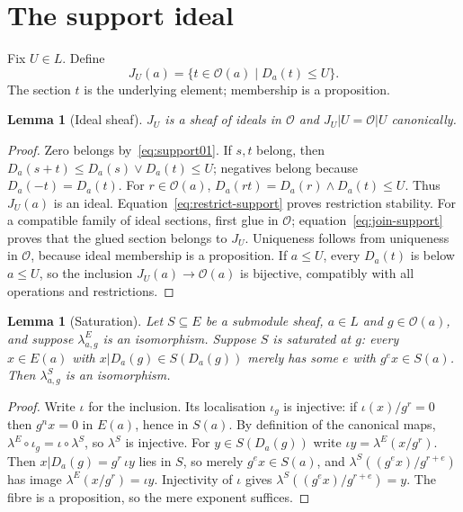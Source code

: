 \documentclass[11pt]{amsart}
\newtheorem{lemma}[theorem]{Lemma}
\theoremstyle{definition}\newtheorem{definition}[theorem]{Definition}
\theoremstyle{remark}\newtheorem{remark}[theorem]{Remark}
\newcommand{\OO}{\mathcal O}
\begin{document}
\section{The support ideal}\label{sec:supportideal}
Fix $U\in L$. Define
\begin{equation}\label{eq:J}
 J_U(a)=\{t\in\OO(a)\mid D_a(t)\le U\}.
\end{equation}
The section $t$ is the underlying element; membership is a proposition.

\begin{lemma}[Ideal sheaf]\label{lem:J-sheaf}
$J_U$ is a sheaf of ideals in $\OO$ and $J_U|U=\OO|U$ canonically.
\end{lemma}
\begin{proof}
Zero belongs by~\eqref{eq:support01}. If $s,t$ belong, then
$D_a(s+t)\le D_a(s)\vee D_a(t)\le U$; negatives belong because
$D_a(-t)=D_a(t)$. For $r\in\OO(a)$,
$D_a(rt)=D_a(r)\wedge D_a(t)\le U$. Thus $J_U(a)$ is an ideal.
Equation~\eqref{eq:restrict-support} proves restriction stability.
For a compatible family of ideal sections, first glue in $\OO$;
equation~\eqref{eq:join-support} proves that the glued section
belongs to $J_U$. Uniqueness follows from uniqueness in $\OO$,
because ideal membership is a proposition. If $a\le U$, every
$D_a(t)$ is below $a\le U$, so the inclusion $J_U(a)\to\OO(a)$
is bijective, compatibly with all operations and restrictions.
\end{proof}

\begin{lemma}[Saturation]\label{lem:saturation}
Let $S\subseteq E$ be a submodule sheaf, $a\in L$ and $g\in\OO(a)$,
and suppose $\lambda^E_{a,g}$ is an isomorphism. Suppose $S$ is
\emph{saturated at $g$}: every $x\in E(a)$ with $x|D_a(g)\in S(D_a(g))$
merely has some $e$ with $g^ex\in S(a)$. Then $\lambda^S_{a,g}$ is an
isomorphism.
\end{lemma}
\begin{proof}
Write $\iota$ for the inclusion. Its localisation $\iota_g$ is
injective: if $\iota(x)/g^r=0$ then $g^n x=0$ in $E(a)$, hence in
$S(a)$. By definition of the canonical maps,
$\lambda^E\circ\iota_g=\iota\circ\lambda^S$, so $\lambda^S$ is
injective. For $y\in S(D_a(g))$ write $\iota y=\lambda^E(x/g^r)$.
Then $x|D_a(g)=g^r\,\iota y$ lies in $S$, so merely $g^ex\in S(a)$,
and $\lambda^S((g^ex)/g^{r+e})$ has image $\lambda^E(x/g^r)=\iota y$.
Injectivity of $\iota$ gives $\lambda^S((g^ex)/g^{r+e})=y$. The fibre
is a proposition, so the mere exponent suffices.
\end{proof}
\end{document}
